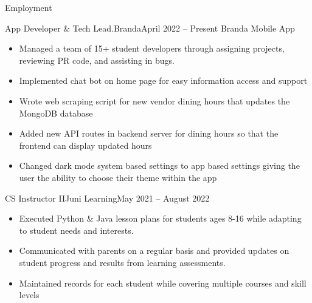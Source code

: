 \documentclass[]{mcdowellcv}
\begin{document}
	\makeheader
	
	\begin{cvsection}{Employment}
		\begin{cvsubsection}{App Developer & Tech Lead.}{Branda}{April 2022 – Present}
			Branda Mobile App			
			\begin{itemize}
				\item Managed a team of 15+ student developers through assigning projects, reviewing PR code, and assisting in bugs.
				\item Implemented chat bot on home page for easy information access and support
				\item Wrote web scraping script for new vendor dining hours that updates the MongoDB database
				\item Added new API routes in backend server for dining hours so that the frontend can display updated hours
				\item Changed dark mode system based settings to app based settings giving the user the ability to choose their theme within the app
			\end{itemize}
		\end{cvsubsection}
		
		\begin{cvsubsection}{CS Instructor II}{Juni Learning}{May 2021 – August 2022}	
			\begin{itemize}
				\item Executed Python & Java lesson plans for students ages 8-16 while adapting to student needs and interests.
				\item Communicated with parents on a regular basis and provided updates on student progress and results from learning assessments.
				\item Maintained records for each student while covering multiple courses and skill levels
			\end{itemize}
		\end{cvsubsection}
		
	\end{cvsection}
	
\end{document}
